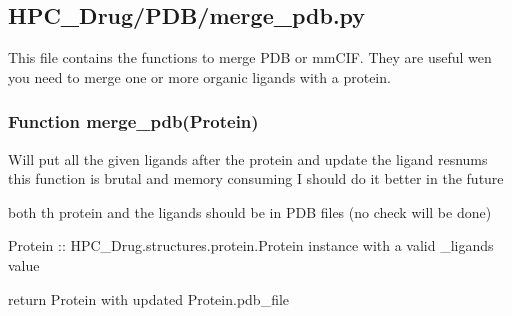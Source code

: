 

\subsection{HPC\_Drug/PDB/merge\_pdb.py}

    This file contains the functions to merge PDB or mmCIF. They are useful wen you need to merge one or more organic ligands with a protein.

    \subsubsection{Function merge\_pdb(Protein)}
    
        Will put all the given ligands after the protein and update the ligand resnums this function is brutal and memory consuming I should do it better in the future

        both th protein and the ligands should be in PDB files (no check will be done)

        Protein :: HPC\_Drug.structures.protein.Protein instance with a valid \_ligands value

        return Protein with updated Protein.pdb\_file